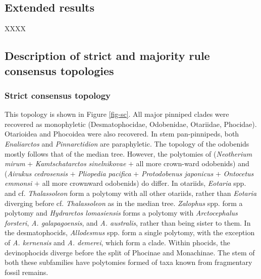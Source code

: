\documentclass[a4paper, 12pt]{article}
\begin{document}
\subsection{Extended results}

XXXX

\subsection{Description of strict and majority rule consensus topologies}

\subsubsection{Strict consensus topology}

This topology is shown in Figure \ref{fig-sc}. All major pinniped clades were recovered as monophyletic (Desmatophocidae, Odobenidae, Otariidae, Phocidae). Otarioidea and Phocoidea were also recovered. In stem pan-pinnipeds, both \textit{Enaliarctos} and \textit{Pinnarctidion} are paraphyletic. The topology of the odobenids mostly follows that of the median tree. However, the polytomies of (\textit{Neotherium mirum} + \textit{Kamtschatarctos sinelnikovae} $+$ all more crown-ward odobenids) and (\textit{Aivukus cedrosensis} $+$ \textit{Pliopedia pacifica} $+$ \textit{Protodobenus japonicus} $+$ \textit{Ontocetus emmonsi} $+$ all more crownward odobenids) do differ. In otariids, \textit{Eotaria} spp. and cf. \textit{Thalassoleon} form a polytomy with all other otariids, rather than \textit{Eotaria} diverging before cf. \textit{Thalassoleon} as in the median tree. \textit{Zalophus} spp. form a polytomy and \textit{Hydrarctos lomasiensis} forms a polytomy with \textit{Arctocephalus forsteri}, \textit{A. galapagoensis}, and \textit{A. australis}, rather than being sister to them. In the desmatophocids, \textit{Allodesmus} spp. form a single polytomy, with the exception of \textit{A. kernensis} and \textit{A. demerei}, which form a clade. Within phocids, the devinophocids diverge before the split of Phocinae and Monachinae. The stem of both these subfamilies have polytomies formed of taxa known from fragmentary fossil remains.
\end{document}
